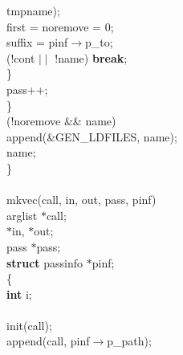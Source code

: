 \begin{flushleft}
\hspace*{15\indentation}tmpname);\mbox{}\\
\hspace*{9\indentation}first = noremove = 0;\mbox{}\\
\hspace*{9\indentation}suffix = pinf$\rightarrow$p\_to;\mbox{}\\
\hspace*{9\indentation}{\bf if} (!cont $\mid\mid$ !name) {\bf break};\mbox{}\\
\hspace*{6\indentation}\}\mbox{}\\
\hspace*{6\indentation}pass++;\mbox{}\\
\hspace*{3\indentation}\}\mbox{}\\
\hspace*{3\indentation}{\bf if} (!noremove \&\& name)\mbox{}\\
\hspace*{6\indentation}append(\&GEN\_LDFILES, name);\mbox{}\\
\hspace*{3\indentation}{\bf return} name;\mbox{}\\
\}\mbox{}\\
\mbox{}\\
mkvec(call, in, out, pass, pinf)\mbox{}\\
\hspace*{3\indentation}{\bf struct} arglist $\ast$call;\mbox{}\\
\hspace*{3\indentation}{\bf char} $\ast$in, $\ast$out;\mbox{}\\
\hspace*{3\indentation}{\bf struct} pass $\ast$pass;\mbox{}\\
\hspace*{3\indentation}{\bf register} {\bf struct} passinfo $\ast$pinf;\mbox{}\\
\{\mbox{}\\
\hspace*{3\indentation}{\bf register} {\bf int} i;\mbox{}\\
\mbox{}\\
\hspace*{3\indentation}init(call);\mbox{}\\
\hspace*{3\indentation}append(call, pinf$\rightarrow$p\_path);\mbox{}\\

\end{flushleft}
